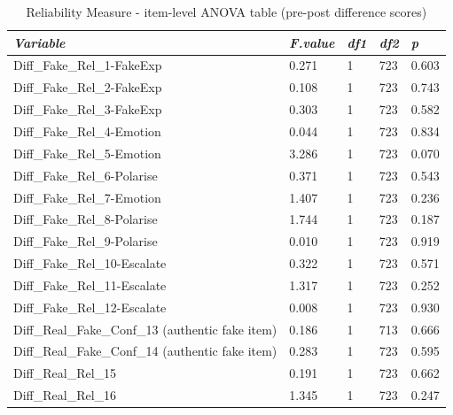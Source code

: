 \documentclass[empirical, authordate, issue]{jote-new-article}
\begin{document}
\begin{table}

  \caption{Reliability Measure - item-level ANOVA table (pre-post difference scores)}
  \label{tab:tableS26}


  \begin{tabularx}{\linewidth}{@{} l  l  l  l  l@{}}
    \toprule

    \emph{Variable}                                  & \emph{F.value} & \emph{df1} & \emph{df2} & \emph{p} \\
    \midrule
    Diff\_Fake\_Rel\_1-FakeExp                       & 0.271          & 1          & 723        & 0.603    \\
    Diff\_Fake\_Rel\_2-FakeExp                       & 0.108          & 1          & 723        & 0.743    \\
    Diff\_Fake\_Rel\_3-FakeExp                       & 0.303          & 1          & 723        & 0.582    \\
    Diff\_Fake\_Rel\_4-Emotion                       & 0.044          & 1          & 723        & 0.834    \\
    Diff\_Fake\_Rel\_5-Emotion                       & 3.286          & 1          & 723        & 0.070    \\
    Diff\_Fake\_Rel\_6-Polarise                      & 0.371          & 1          & 723        & 0.543    \\
    Diff\_Fake\_Rel\_7-Emotion                       & 1.407          & 1          & 723        & 0.236    \\
    Diff\_Fake\_Rel\_8-Polarise                      & 1.744          & 1          & 723        & 0.187    \\
    Diff\_Fake\_Rel\_9-Polarise                      & 0.010          & 1          & 723        & 0.919    \\
    Diff\_Fake\_Rel\_10-Escalate                     & 0.322          & 1          & 723        & 0.571    \\
    Diff\_Fake\_Rel\_11-Escalate                     & 1.317          & 1          & 723        & 0.252    \\
    Diff\_Fake\_Rel\_12-Escalate                     & 0.008          & 1          & 723        & 0.930    \\
    Diff\_Real\_Fake\_Conf\_13 (authentic fake item) & 0.186          & 1          & 713        & 0.666    \\
    Diff\_Real\_Fake\_Conf\_14 (authentic fake item) & 0.283          & 1          & 723        & 0.595    \\
    Diff\_Real\_Rel\_15                              & 0.191          & 1          & 723        & 0.662    \\
    Diff\_Real\_Rel\_16                              & 1.345          & 1          & 723        & 0.247    \\
    \bottomrule
  \end{tabularx}


\end{table}
\end{document}
